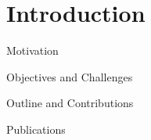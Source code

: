 
\graphicspath{{assets/chapter_1/}}

\chapter{Introduction}

\begin{section}{Motivation}

\end{section}

\begin{section}{Objectives and Challenges}

\end{section}

\begin{section}{Outline and Contributions}

\end{section}

\begin{section}{Publications}

\end{section}
